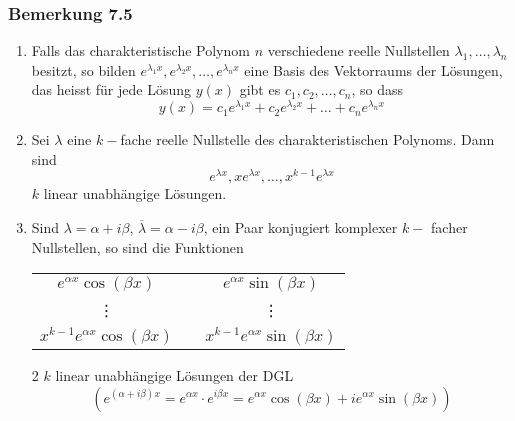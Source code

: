 \subsubsection*{Bemerkung 7.5}
\begin{enumerate}
\item Falls das charakteristische Polynom $n$ verschiedene reelle Nullstellen $\lambda_1,\dots,\lambda_n$ besitzt, so bilden ${e^{{\lambda _1}x}},{e^{{\lambda _2}x}}, \ldots ,{e^{{\lambda _n}x}}$ eine Basis des Vektorraums der Lösungen, das heisst für jede Lösung $y(x)$ gibt es $c_1,c_2,\dots,c_n$, so dass \[y(x)={c_1}{e^{{\lambda _1}x}} + {c_2}{e^{{\lambda _2}x}} +  \ldots  + {c_n}{e^{{\lambda _n}x}}\]

\item Sei $\lambda$ eine $k-$fache reelle Nullstelle des charakteristischen Polynoms. Dann sind \[e^{\lambda x},xe^{\lambda x},\dots ,x^{k-1}e^{\lambda x}\] $k$ linear unabhängige Lösungen.
\item Sind $\lambda=\alpha+i\beta$, $\overline{\lambda}=\alpha-i\beta$, ein Paar konjugiert komplexer $k-$ facher Nullstellen, so sind die Funktionen\\\begin{center}
\begin{tabular}{c c c}
$e^{\alpha x}\cos\left(\beta x\right)$&\hspace{10mm}&$e^{\alpha x}\sin\left(\beta x\right)$\\
\vdots&\hspace{10mm} & \vdots\\
$x^{k-1}e^{\alpha x}\cos\left(\beta x\right)$&\hspace{10mm}&$x^{k-1}e^{\alpha x}\sin\left(\beta x\right)$\\
\end{tabular}
\end{center}
2 $k$ linear unabhängige Lösungen der DGL \[\left( {{e^{\left( {\alpha  + i\beta } \right)x}} = {e^{\alpha x}} \cdot {e^{i\beta x}} = {e^{\alpha x}}\cos \left( {\beta x} \right) + i{e^{\alpha x}}\sin \left( {\beta x} \right)} \right)\]
\end{enumerate}

